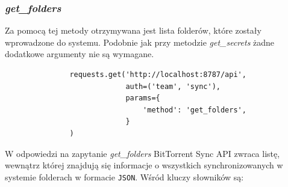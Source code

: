 \documentclass[polish,a4paper,twoside]{ppfcmthesis}
\begin{document}
\subsubsection*{\emph{get\_folders}}

Za pomocą tej metody otrzymywana jest lista folderów, które zostały wprowadzone do systemu. Podobnie jak przy metodzie \emph{get\_secrets} żadne dodatkowe argumenty nie są wymagane.

\begin{minipage}{\linewidth}
\vspace{15pt}
\begin{verbatim}
               requests.get('http://localhost:8787/api',
                            auth=('team', 'sync'),
                            params={
                                'method': 'get_folders',
                            }
               )
\end{verbatim}
\vspace{15pt}
\end{minipage}

W odpowiedzi na zapytanie \emph{get\_folders} BitTorrent Sync API zwraca listę, wewnątrz której znajdują się informacje o wszystkich synchronizowanych w systemie folderach w formacie \texttt{JSON}. Wśród kluczy słowników są:
\end{document}
